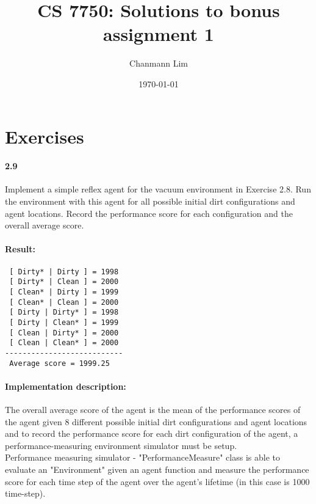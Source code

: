 \documentclass[a4paper]{article}
\begin{document}
\title{CS 7750: Solutions to bonus assignment 1}
\author{Chanmann Lim}
\date{\today}
\maketitle

\lstset{language=Java,title=\lstname,basicstyle=\footnotesize}

\section*{Exercises}

\paragraph{2.9}
Implement a simple reflex agent for the vacuum environment in Exercise 2.8. Run the environment with this agent for all 
possible initial dirt configurations and agent locations. Record the performance score for each configuration and the overall 
average score.

\paragraph{Result:}
\begin{verbatim}
 [ Dirty* | Dirty ] = 1998
 [ Dirty* | Clean ] = 2000
 [ Clean* | Dirty ] = 1999
 [ Clean* | Clean ] = 2000
 [ Dirty | Dirty* ] = 1998
 [ Dirty | Clean* ] = 1999
 [ Clean | Dirty* ] = 2000
 [ Clean | Clean* ] = 2000
---------------------------
 Average score = 1999.25
\end{verbatim}

\paragraph{Implementation description:}
The overall average score of the agent is the mean of the performance scores of the agent given 8 different possible initial dirt 
configurations and agent locations and to record the performance score for each dirt configuration of the agent, a 
performance-measuring environment simulator must be setup. \\

Performance measuring simulator - "PerformanceMeasure" class is able to evaluate an "Environment" given an agent function and 
measure the performance score for each time step of the agent over the agent's lifetime (in this case is 1000 time-step). \\
\end{document}
